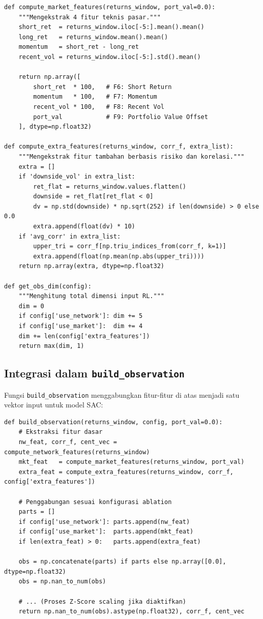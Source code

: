 \documentclass[12pt,a4paper]{article}
\begin{document}
\begin{lstlisting}[caption={Market \& Extra Feature Engineering}]
def compute_market_features(returns_window, port_val=0.0):
    """Mengekstrak 4 fitur teknis pasar."""
    short_ret  = returns_window.iloc[-5:].mean().mean()
    long_ret   = returns_window.mean().mean()
    momentum   = short_ret - long_ret
    recent_vol = returns_window.iloc[-5:].std().mean()
    
    return np.array([
        short_ret  * 100,   # F6: Short Return
        momentum   * 100,   # F7: Momentum
        recent_vol * 100,   # F8: Recent Vol
        port_val            # F9: Portfolio Value Offset
    ], dtype=np.float32)

def compute_extra_features(returns_window, corr_f, extra_list):
    """Mengekstrak fitur tambahan berbasis risiko dan korelasi."""
    extra = []
    if 'downside_vol' in extra_list:
        ret_flat = returns_window.values.flatten()
        downside = ret_flat[ret_flat < 0]
        dv = np.std(downside) * np.sqrt(252) if len(downside) > 0 else 0.0
        extra.append(float(dv) * 10)
    if 'avg_corr' in extra_list:
        upper_tri = corr_f[np.triu_indices_from(corr_f, k=1)]
        extra.append(float(np.mean(np.abs(upper_tri))))
    return np.array(extra, dtype=np.float32)

def get_obs_dim(config):
    """Menghitung total dimensi input RL."""
    dim = 0
    if config['use_network']: dim += 5
    if config['use_market']:  dim += 4
    dim += len(config['extra_features'])
    return max(dim, 1)
\end{lstlisting}

\subsection{Integrasi dalam \texttt{build\_observation}}

Fungsi \texttt{build\_observation} menggabungkan fitur-fitur di atas menjadi satu vektor input untuk model SAC:

\begin{lstlisting}[caption={build\_observation -- Cell 10}]
def build_observation(returns_window, config, port_val=0.0):
    # Ekstraksi fitur dasar
    nw_feat, corr_f, cent_vec = compute_network_features(returns_window)
    mkt_feat   = compute_market_features(returns_window, port_val)
    extra_feat = compute_extra_features(returns_window, corr_f, config['extra_features'])

    # Penggabungan sesuai konfigurasi ablation
    parts = []
    if config['use_network']: parts.append(nw_feat)
    if config['use_market']:  parts.append(mkt_feat)
    if len(extra_feat) > 0:   parts.append(extra_feat)

    obs = np.concatenate(parts) if parts else np.array([0.0], dtype=np.float32)
    obs = np.nan_to_num(obs)
    
    # ... (Proses Z-Score scaling jika diaktifkan)
    return np.nan_to_num(obs).astype(np.float32), corr_f, cent_vec
\end{lstlisting}
\end{document}
